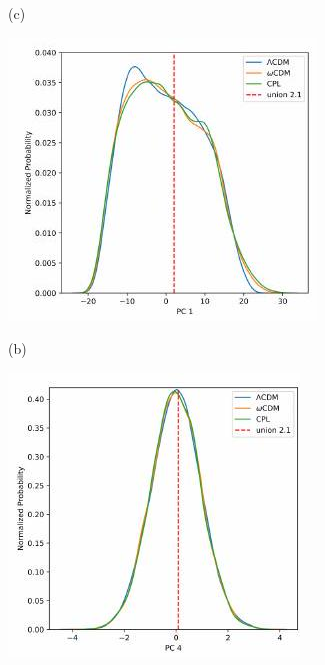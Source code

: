 \documentclass[10pt]{article}
\begin{document}
(c)

\includegraphics[max width=\textwidth]{2022_04_28_9be604c658276336b08cg-09(2)}

(b)

\includegraphics[max width=\textwidth]{2022_04_28_9be604c658276336b08cg-09(3)}
\end{document}
